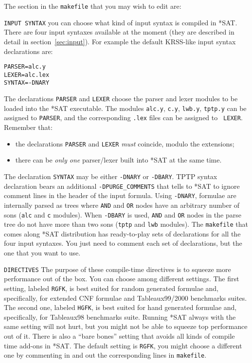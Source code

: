 \documentclass[12pt]{report}
\begin{document}
The section in the {\tt makefile} that you may wish to edit are:
\begin{description}
	\item{\tt INPUT SYNTAX} you can choose what kind of
	input syntax is compiled in *SAT. There are four input
	syntaxes available at the moment (they are described in 
	detail in section~\ref{sec:input}). For example the default
	KRSS-like input syntax declarations are:
	\begin{alltt}
		PARSER = alc.y
		LEXER = alc.lex
		SYNTAX = -DNARY 
	\end{alltt}
	The declarations {\tt PARSER} and {\tt LEXER} choose the
	parser and lexer modules to be loaded into the *SAT
	executable. The modules {\tt alc.y}, {\tt c.y}, {\tt lwb.y},
	{\tt tptp.y} can be assigned to {\tt PARSER}, and the
	corresponding {\tt .lex} files can be assigned to {\tt
	LEXER}. Remember that:
	\begin{itemize}
		\item the declarations {\tt PARSER} and {\tt LEXER}
		\textit{must} coincide, modulo the extensions;
		\item there can be \textit{only one} parser/lexer
 		built into *SAT at the same time.
	\end{itemize}
	The declaration {\tt SYNTAX} may be either
	{\tt -DNARY} or {\tt -DBARY}. TPTP syntax declaration bears an additional
	{\tt -DPURGE\_COMMENTS} that tells to *SAT to ignore comment
	lines in the header of the input formula. Using {\tt -DNARY}, 
	formulae are internally parsed as trees where {\tt AND} and {\tt OR}
	nodes have an arbitrary number of sons ({\tt alc} and {\tt c} modules). 
	When {\tt -DBARY} is used, {\tt AND} and {\tt OR} nodes in the parse
	tree do not have more than two sons ({\tt tptp} and {\tt lwb}
	modules). The {\tt makefile} that comes along *SAT
	distribution has ready-to-play sets of declarations for all the four
	input syntaxes. You just need to comment each set of
	declarations, but the one that you want to use.
	
	\item{\tt DIRECTIVES} The purpose of these compile-time
	directives is to squeeze more performance out of the box.
	You can choose among different
	settings. The first setting, labeled {\tt RGFK}, is best suited for
	random generated formulae and, specifically, for extended CNF
	formulae and Tableaux99/2000 benchmarks suites. 
	The second one, labeled {\tt HGFK},
	is best suited for hand generated formulae and, specifically,
	for Tableaux98 benchmarks suite. 
	Running *SAT always with the same	
	setting will not hurt, but you might not be able to squeeze top
	performance out of it. There is also a ``bare bones'' setting
	that avoids all kinds of compile time add-ons in *SAT. The
	default setting is {\tt RGFK}, you might choose a different one
	by commenting in and out the corresponding lines in {\tt makefile}. 


\end{description}
\end{document}
